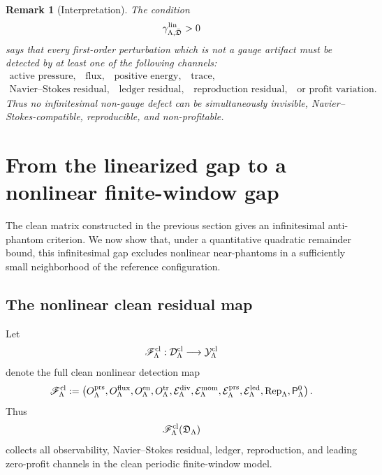 \documentclass[11pt]{article}
\numberwithin{equation}{section}
\newtheorem{remark}[theorem]{Remark}
\begin{document}
\begin{remark}[Interpretation]
The condition
\[
        \gamma_{\Lambda,\bar{\mathfrak D}}^{\rm lin}>0
\]
says that every first-order perturbation which is not a gauge artifact must
be detected by at least one of the following channels:
\[
\begin{gathered}
        \text{active pressure,}\quad
        \text{flux,}\quad
        \text{positive energy,}\quad
        \text{trace,}\\
        \text{Navier--Stokes residual,}\quad
        \text{ledger residual,}\quad
        \text{reproduction residual,}\quad
        \text{or profit variation.}
\end{gathered}
\]
Thus no infinitesimal non-gauge defect can be simultaneously invisible,
Navier--Stokes-compatible, reproducible, and non-profitable.
\end{remark}


\section{From the linearized gap to a nonlinear finite-window gap}\label{sec:linearized-to-nonlinear-gap}

The clean matrix constructed in the previous section gives an infinitesimal
anti-phantom criterion.  We now show that, under a quantitative quadratic
remainder bound, this infinitesimal gap excludes nonlinear near-phantoms in
a sufficiently small neighborhood of the reference configuration.

\subsection{The nonlinear clean residual map}

Let
\[
        \mathscr F_\Lambda^{\rm cl}
        :
        \mathcal D_\Lambda^{\rm cl}
        \longrightarrow
        \mathcal Y_\Lambda^{\rm cl}
\]
denote the full clean nonlinear detection map
\[
        \mathscr F_\Lambda^{\rm cl}
        :=
        \left(
        O_\Lambda^{\rm prs},
        O_\Lambda^{\rm flux},
        O_\Lambda^{\rm en},
        O_\Lambda^{\rm tr},
        \mathcal E_\Lambda^{\rm div},
        \mathcal E_\Lambda^{\rm mom},
        \mathcal E_\Lambda^{\rm prs},
        \mathcal E_\Lambda^{\rm led},
        \operatorname{Rep}_\Lambda,
        \mathsf P_\Lambda^0
        \right).
\]
Thus
\[
        \mathscr F_\Lambda^{\rm cl}(\mathfrak D_\Lambda)
\]
collects all observability, Navier--Stokes residual, ledger, reproduction,
and leading zero-profit channels in the clean periodic finite-window model.
\end{document}

